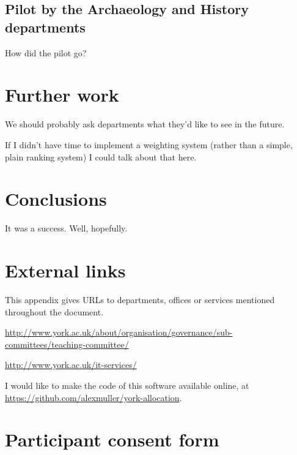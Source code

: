 \documentclass[]{scrartcl}
\begin{document}
\subsection{Pilot by the Archaeology and History departments}

How did the pilot go?

\section{Further work}


We should probably ask departments what they'd like to see in the future.

If I didn't have time to implement a weighting system (rather than a simple,
plain ranking system) I could talk about that here.

\section{Conclusions}


It was a success. Well, hopefully.

\appendix


\newpage
\section{External links}

This appendix gives URLs to departments, offices or services mentioned
throughout the document.

\url{http://www.york.ac.uk/about/organisation/governance/sub-committees/teaching-committee/}

\url{http://www.york.ac.uk/it-services/}

I would like to make the code of this software available online, at
\url{https://github.com/alexmuller/york-allocation}.

\newpage
\section{Participant consent form}
\label{sec:consent}
\end{document}
